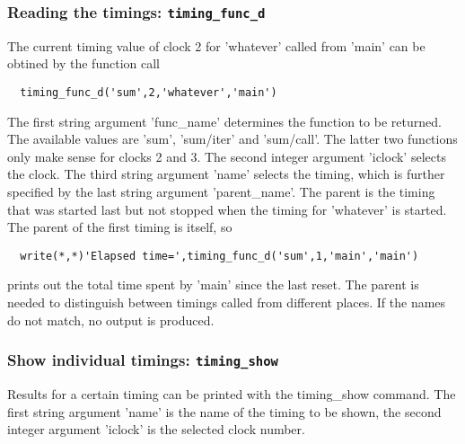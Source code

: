 \subsubsection{Reading the timings: {\tt timing\_func\_d}}

The current timing value of clock 2 for 'whatever' called from 'main'
can be obtined by the function call
\begin{verbatim}
  timing_func_d('sum',2,'whatever','main')
\end{verbatim}
The first string argument 'func\_name' determines the function
to be returned. The available values are 'sum', 'sum/iter' and 'sum/call'.
The latter two functions only make sense for clocks 2 and 3.
The second integer argument 'iclock' selects the clock.
The third string argument 'name' selects the timing,
which is further specified by the last string argument 'parent\_name'.
The parent is the timing that was started last but not stopped when
the timing for 'whatever' is started. The parent of the first timing
is itself, so
\begin{verbatim}
  write(*,*)'Elapsed time=',timing_func_d('sum',1,'main','main')
\end{verbatim}
prints out the total time spent by 'main' since the last reset. 
The parent is needed to distinguish between timings called from 
different places. If the names do not match, no output is produced.

\subsubsection{Show individual timings: {\tt timing\_show}}

Results for a certain timing can be printed with the timing\_show command.
The first string argument 'name' is the name of the timing to be shown, 
the second integer argument 'iclock' is the selected clock number.

